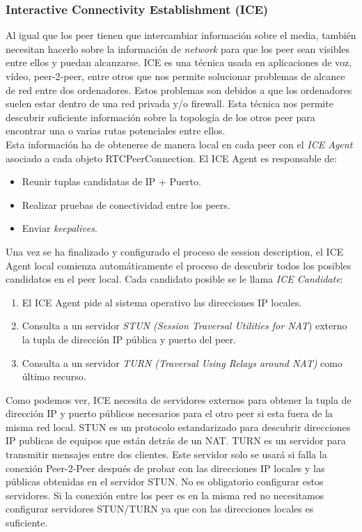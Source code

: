 \subsubsection{Interactive Connectivity Establishment (ICE)}

Al igual que los peer tienen que intercambiar información sobre el media, también necesitan hacerlo sobre la información de \textit{network} para que los peer sean visibles entre ellos y puedan alcanzarse. ICE es una técnica usada en aplicaciones de voz, vídeo, peer-2-peer, entre otros que nos permite solucionar problemas de alcance de red entre dos ordenadores. Estos problemas son debidos a que los ordenadores suelen estar dentro de una red privada y/o firewall. Esta técnica nos permite descubrir suficiente información sobre la topología de los otros peer para encontrar una o varias rutas potenciales entre ellos.\\

Esta información ha de obtenerse de manera local en cada peer con el \textit{ICE Agent} asociado a cada objeto RTCPeerConnection. El ICE Agent es responsable de: 

\begin{itemize}
\item Reunir tuplas candidatas de IP + Puerto.
\item Realizar pruebas de conectividad entre los peers.
\item Enviar \textit{keepalives}.
\end{itemize}

Una vez se ha finalizado y configurado el proceso de session description, el ICE Agent local comienza automáticamente el proceso de descubrir todos los posibles candidatos en el peer local. Cada candidato posible se le llama \textit{ICE Candidate}:

\begin{enumerate}
\item El ICE Agent pide al sistema operativo las direcciones IP locales.
\item Consulta a un servidor \emph{STUN (Session Traversal Utilities for NAT}) externo la tupla de dirección IP pública y puerto del peer.
\item Consulta a un servidor \emph{TURN (Traversal Using Relays around NAT)} como último recurso. 
\end{enumerate}

Como podemos ver, ICE necesita de servidores externos para obtener la tupla de dirección IP y puerto públicos necesarios para el otro peer si esta fuera de la misma red local. STUN  es un protocolo estandarizado para descubrir direcciones IP publicas de equipos que están detrás de un NAT. TURN es un servidor para transmitir mensajes entre dos clientes. Este servidor solo se usará si falla la conexión Peer-2-Peer después de probar con las direcciones IP locales y las públicas obtenidas en el servidor STUN. No es obligatorio configurar estos servidores. Si la conexión entre los peer es en la misma red no necesitamos configurar servidores STUN/TURN ya que con las direcciones locales es suficiente.\\

